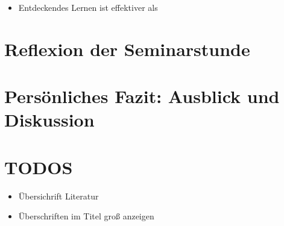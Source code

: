 \documentclass[jour,12pt,a4paper]{apa6}
\begin{document}
\begin{itemize}
  \item Entdeckendes Lernen ist effektiver als 
\end{itemize}

\section{Reflexion der Seminarstunde}

\section{Persönliches Fazit: Ausblick und Diskussion}

\section{TODOS}

\begin{itemize}
  \item Übersichrift Literatur
  \item Überschriften im Titel groß anzeigen
\end{itemize}

\printbibliography
\end{document}
